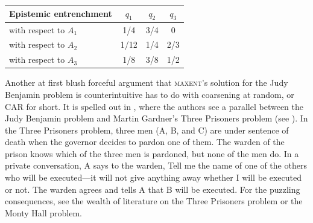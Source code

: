 \documentclass[12pt]{article}
\begin{document}

\bigskip

\begin{tabular}{|l|c|c|c|}\hline
Epistemic entrenchment & $q_{1}$ & $q_{2}$ & $q_{3}$ \\ \hline
with respect to $A_{1}$ & 1/4 & 3/4 & 0 \\ \hline
with respect to $A_{2}$ & 1/12 & 1/4 & 2/3 \\ \hline
with respect to $A_{3}$ & 1/8 & 3/8 & 1/2 \\ \hline
\end{tabular}

\bigskip

\nias Another at first blush forceful argument that \textsc{maxent}'s
solution for the Judy Benjamin problem is counterintuitive has to do
with coarsening at random, or CAR for short. It is spelled out in
, where the authors see a parallel
between the Judy Benjamin problem and Martin Gardner's Three Prisoners
problem (see ). In the Three Prisoners
problem, three men (A, B, and C) are under sentence of death when the
governor decides to pardon one of them. The warden of the prison knows
which of the three men is pardoned, but none of the men do. In a
private conversation, A says to the warden, Tell me the name of one of
the others who will be executed---it will not give anything away
whether I will be executed or not. The warden agrees and tells A that
B will be executed. For the puzzling consequences, see the wealth of
literature on the Three Prisoners problem or the Monty Hall problem.
\end{document}
